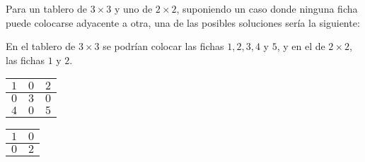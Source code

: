 \documentclass[11pt, a4paper, twoside]{article}
\begin{document}
\begin{ejemplo}

  Para un tablero de $3\times 3$ y uno de $2\times 2$, suponiendo un caso  donde
  ninguna ficha puede colocarse adyacente a otra, una de las posibles  soluciones
  sería la siguiente:

  En el tablero de $3\times 3$ se podrían colocar las fichas $1,2,3,4$  y $5$, y
  en el de $2\times 2$, las fichas $1$ y $2$.

  \begin{center}
      \begin{minipage}{0.2\textwidth}
          \begin{tabular}{|c|c|c|}
              \hline
               $1$ & $0$ & $2$ \\
              \hline
               $0$ & $3$ & $0$  \\
              \hline
               $4$ & $0$ & $5$ \\
              \hline
          \end{tabular}
      \end{minipage}
      \begin{minipage}{0.2\textwidth}
          \begin{tabular}{|c|c|}
              \hline
               $1$ & $0$ \\
              \hline
               $0$ & $2$ \\
              \hline
          \end{tabular}
      \end{minipage}
  \end{center}

\end{ejemplo}
\end{document}
